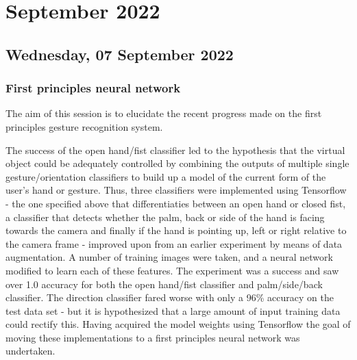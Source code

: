 \chapter[2022 September]{September 2022}

\section[2022/09/07]{Wednesday, 07 September 2022}

\subsection{First principles neural network}

The aim of this session is to elucidate the recent progress made on the first principles gesture recognition system.

The success of the open hand/fist classifier led to the hypothesis that the virtual object could be adequately controlled by combining the outputs of multiple single gesture/orientation classifiers to build up a model of the current form of the user's hand or gesture. Thus, three classifiers were implemented using Tensorflow - the one specified above that differentiaties between an open hand or closed fist, a classifier that detects whether the palm, back or side of the hand is facing towards the camera and finally if the hand is pointing up, left or right relative to the camera frame - improved upon from an earlier experiment by means of data augmentation. A number of training images were taken, and a neural network modified to learn each of these features. The experiment was a success and saw over 1.0 accuracy for both the open hand/fist classifier and palm/side/back classifier. The direction classifier fared worse with only a 96\% accuracy on the test data set - but it is hypothesized that a large amount of input training data could rectify this. Having acquired the model weights using Tensorflow the goal of moving these implementations to a first principles neural network was undertaken. \\

